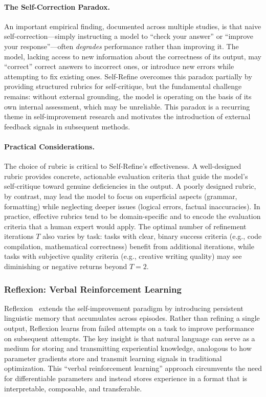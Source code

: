 \paragraph{The Self-Correction Paradox.}
An important empirical finding, documented across multiple studies, is that naive self-correction---simply instructing a model to ``check your answer'' or ``improve your response''---often \emph{degrades} performance rather than improving it. The model, lacking access to new information about the correctness of its output, may ``correct'' correct answers to incorrect ones, or introduce new errors while attempting to fix existing ones. Self-Refine overcomes this paradox partially by providing structured rubrics for self-critique, but the fundamental challenge remains: without external grounding, the model is operating on the basis of its own internal assessment, which may be unreliable. This paradox is a recurring theme in self-improvement research and motivates the introduction of external feedback signals in subsequent methods.

\paragraph{Practical Considerations.}
The choice of rubric is critical to Self-Refine's effectiveness. A well-designed rubric provides concrete, actionable evaluation criteria that guide the model's self-critique toward genuine deficiencies in the output. A poorly designed rubric, by contrast, may lead the model to focus on superficial aspects (grammar, formatting) while neglecting deeper issues (logical errors, factual inaccuracies). In practice, effective rubrics tend to be domain-specific and to encode the evaluation criteria that a human expert would apply. The optimal number of refinement iterations $T$ also varies by task: tasks with clear, binary success criteria (e.g., code compilation, mathematical correctness) benefit from additional iterations, while tasks with subjective quality criteria (e.g., creative writing quality) may see diminishing or negative returns beyond $T = 2$.


\subsubsection{Reflexion: Verbal Reinforcement Learning}
\label{sec:reflexion}

Reflexion~\citep{shinn2023reflexion} extends the self-improvement paradigm by introducing persistent linguistic memory that accumulates across episodes. Rather than refining a single output, Reflexion learns from failed attempts on a task to improve performance on subsequent attempts. The key insight is that natural language can serve as a medium for storing and transmitting experiential knowledge, analogous to how parameter gradients store and transmit learning signals in traditional optimization. This ``verbal reinforcement learning'' approach circumvents the need for differentiable parameters and instead stores experience in a format that is interpretable, composable, and transferable.

